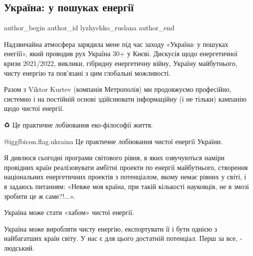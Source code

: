  
 
 
 
 
 
\subsection{Україна: у пошуках енергії}
\label{sec:27_01_2022.fb.lyzhychko_ruslana.1.ukraina_u_poshukah_energii}
 
\ifcmt
 author_begin
   author_id lyzhychko_ruslana
 author_end
\fi

Надзвичайна атмосфера зарядила мене під час заходу «Україна: у пошуках
енегіїї», який проводив рух Україна 30+ у Києві. Дискусія щодо енергетичної
кризи 2021/2022, виклики, гібридну енергетичну війну, Україну майбутнього,
чисту енергію та пов'язані з цим глобальні можливості. 


Разом з Viktor  Kurtev (компанія Метрополія) ми продовжуємо професійно,
системно і на постійній основі здійснювати інформаційну (і не тільки) кампанію
щодо чистої енергії.


♻️ Це практичне лобіювання еко-філософії життя. 

@igg{fbicon.flag.ukraina} Це практичне лобіювання чистої енергії України. 

Я дивлюся сьогодні програми світового рівня, в яких озвучуються наміри
провідних країн реалізовувати амбітні проекти по енергії майбутнього,
створення національних енергетичних проектів з потенціалом, якому немає рівних
у світі, і я задаюсь питанням:  «Невже моя країна, при такій кількості
науковців, не в змозі зробити це ж саме?!...». 

Україна може стати «хабом» чистої енергії.

Україна може виробляти чисту енергію, експортувати її і бути однією з
найбагатших країн світу. У нас є для цього достатній потенціал. Перш за все,  -
людський. 

